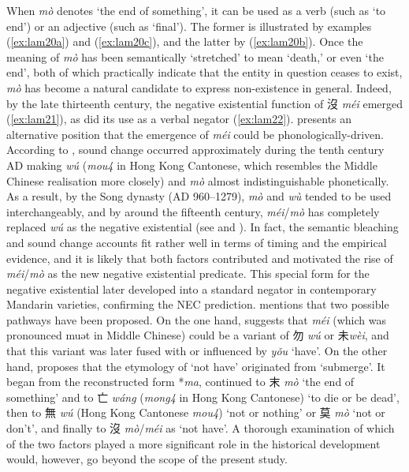 \documentclass[output=paper]{langscibook}
\begin{document}
When \textit{mò} denotes `the end of something', it can be used as a verb (such as `to end') or an adjective (such as `final'). The former is illustrated by examples (\ref{ex:lam20a}) and (\ref{ex:lam20c}), and the latter by (\ref{ex:lam20b}). Once the meaning of \textit{mò} has been semantically `stretched' to mean `death,' or even `the end', both of which practically indicate that the entity in question ceases to exist, \textit{mò} has become a natural candidate to express non-existence in general. Indeed, by the late thirteenth century, the negative existential function of 沒 \textit{méi} emerged (\ref{ex:lam21}), as did its use as a verbal negator (\ref{ex:lam22}). \citet{Xu2003} presents an alternative position that the emergence of \textit{méi} could be phonologically-driven. According to \citeauthor{Xu2003}, sound change occurred approximately during the tenth century AD making \textit{wú} (\textit{mou4} in Hong Kong Cantonese, which resembles the Middle Chinese realisation more closely) and \textit{mò} almost indistinguishable phonetically. As a result, by the Song dynasty (AD 960–1279), \textit{mò} and \textit{wù} tended to be used interchangeably, and by around the fifteenth century, \textit{méi}/\textit{mò} has completely replaced \textit{wú} as the negative existential (see \citealt{PanW2002} and \citealt{Xu2003}). In fact, the semantic bleaching and sound change accounts fit rather well in terms of timing and the empirical evidence, and it is likely that both factors contributed and motivated the rise of \textit{méi}/\textit{mò} as the new negative existential predicate. This special form for the negative existential later developed into a standard negator in contemporary Mandarin varieties, confirming the NEC prediction. \citet[376--377, 517--518]{Schuessler2007} mentions that two possible pathways have been proposed. On the one hand, \citet[126]{Norman1988} suggests that \textit{méi} (which was pronounced muət in Middle Chinese) could be a variant of 勿 \textit{wú} or 未\textit{wèi}, and that this variant was later fused with or influenced by \textit{yǒu} `have'. On the other hand, \citet[121]{Pulleyblank1973} proposes that the etymology of `not have' originated from `submerge'. It began from the reconstructed form *\textit{ma}, continued to 末 \textit{mò} `the end of something' and to 亡 \textit{wáng} (\textit{mong4} in Hong Kong Cantonese) `to die or be dead', then to 無 \textit{wú} (Hong Kong Cantonese \textit{mou4}) `not or nothing' or 莫 \textit{mò} `not or don't', and finally to 沒 \textit{mò}/\textit{méi} as `not have'. A thorough examination of which of the two factors played a more significant role in the historical development would, however, go beyond the scope of the present study. 
\end{document}
